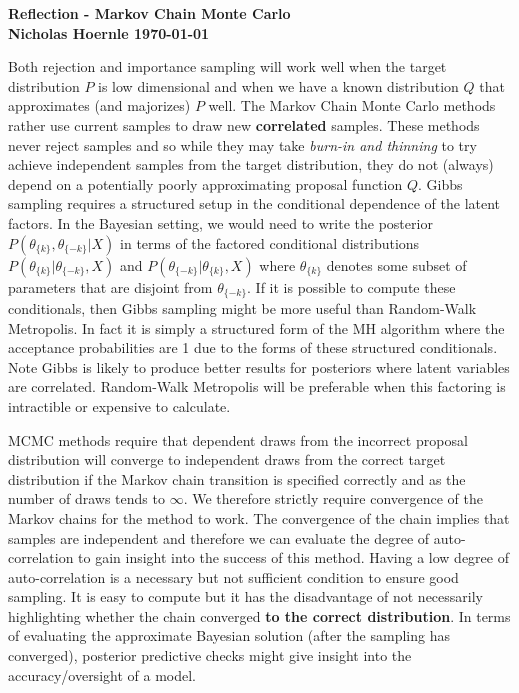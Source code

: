 \documentclass[twoside]{article}
\begin{document}
\textbf{Reflection - Markov Chain Monte Carlo}\\
\textbf{Nicholas Hoernle \hfill \today}

Both rejection and importance sampling will work well when the target distribution $P$ is low dimensional and when we have a known distribution $Q$ that approximates (and majorizes) $P$ well. The Markov Chain Monte Carlo methods rather use current samples to draw new \textbf{correlated} samples. These methods never reject samples and so while they may take \textit{burn-in and thinning} to try achieve independent samples from the target distribution, they do not (always) depend on a potentially poorly approximating proposal function $Q$. Gibbs sampling requires a structured setup in the conditional dependence of the latent factors. In the Bayesian setting, we would need to write the posterior $P(\theta_{\{k\}}, \theta_{\{-k\}} | X)$ in terms of the factored conditional distributions $P(\theta_{\{k\}} |\theta_{\{-k\}}, X)$ and $P(\theta_{\{-k\}} |\theta_{\{k\}}, X)$ where $\theta_{\{k\}}$ denotes some subset of parameters that are disjoint from $\theta_{\{-k\}}$. If it is possible to compute these conditionals, then Gibbs sampling might be more useful than Random-Walk Metropolis. In fact it is simply a structured form of the MH algorithm where the acceptance probabilities are 1 due to the forms of these structured conditionals. Note Gibbs is likely to produce better results for posteriors where latent variables are correlated. Random-Walk Metropolis will be preferable when this factoring is intractible or expensive to calculate.

MCMC methods require that dependent draws from the incorrect proposal distribution will converge to independent draws from the correct target distribution if the Markov chain transition is specified correctly and as the number of draws tends to $\infty$. We therefore strictly require convergence of the Markov chains for the method to work. The convergence of the chain implies that samples are independent and therefore we can evaluate the degree of auto-correlation to gain insight into the success of this method. Having a low degree of auto-correlation is a necessary but not sufficient condition to ensure good sampling. It is easy to compute but it has the disadvantage of not necessarily highlighting whether the chain converged \textbf{to the correct distribution}. In terms of evaluating the approximate Bayesian solution (after the sampling has converged), posterior predictive checks might give insight into the accuracy/oversight of a model.
\end{document}
